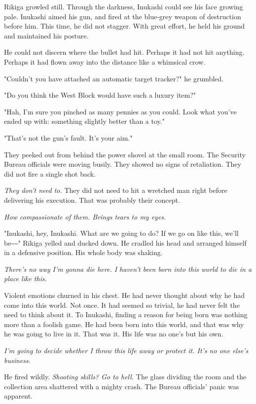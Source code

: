 Rikiga growled still. Through the darkness, Inukashi could see his face
growing pale. Inukashi aimed his gun, and fired at the blue-grey weapon
of destruction before him. This time, he did not stagger. With great
effort, he held his ground and maintained his posture.

He could not discern where the bullet had hit. Perhaps it had not hit
anything. Perhaps it had flown away into the distance like a whimsical
crow.

"Couldn't you have attached an automatic target tracker?" he grumbled.

"Do you think the West Block would have such a luxury item?"

"Hah, I'm sure you pinched as many pennies as you could. Look what
you've ended up with: something slightly better than a toy."

"That's not the gun's fault. It's your aim."

They peeked out from behind the power shovel at the small room. The
Security Bureau officials were moving busily. They showed no signs of
retaliation. They did not fire a single shot back.

\emph{They don't need to.} They did not need to hit a wretched man right before
delivering his execution. That was probably their concept.

\emph{How compassionate of them. Brings tears to my eyes.}

"Inukashi, hey, Inukashi. What are we going to do? If we go on like
this, we'll be―" Rikiga yelled and ducked down. He cradled his head and
arranged himself in a defensive position. His whole body was shaking.

\emph{There's no way I'm gonna die here. I haven't been born into this world
	to die in a place like this.}

Violent emotions churned in his chest. He had never thought about why he
had come into this world. Not once. It had seemed so trivial, he had
never felt the need to think about it. To Inukashi, finding a reason for
being born was nothing more than a foolish game. He had been born into
this world, and that was why he was going to live in it. That was it.
His life was no one's but his own.

\emph{I'm going to decide whether I throw this life away or protect it. It's
	no one else's business.}

He fired wildly. \emph{Shooting skills? Go to hell.} The glass dividing the
room and the collection area shattered with a mighty crash. The Bureau
officials' panic was apparent.

